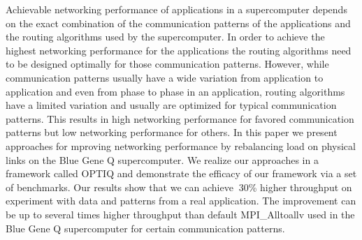 Achievable networking performance of applications in a supercomputer depends on the exact combination of the communication patterns of the applications and the routing algorithms used by the supercomputer. In order to achieve the highest networking performance for the applications the routing algorithms need to be designed optimally for those communication patterns. However, while communication patterns usually have a wide variation from application to application and even from phase to phase in an application, routing algorithms have a limited variation and usually are optimized for typical communication patterns. This results in high networking performance for favored communication patterns but low networking performance for others. In this paper we present approaches for mproving networking performance by rebalancing load on physical links on the Blue Gene Q supercomputer. We realize our approaches in a framework called OPTIQ and demonstrate the efficacy of our framework via a set of benchmarks. Our results show that we can achieve $~$30\% higher throughput on experiment with data and patterns from a real application. The improvement can be up to several times higher throughput than default MPI\_Alltoallv used in the Blue Gene Q supercomputer for certain communication patterns.
